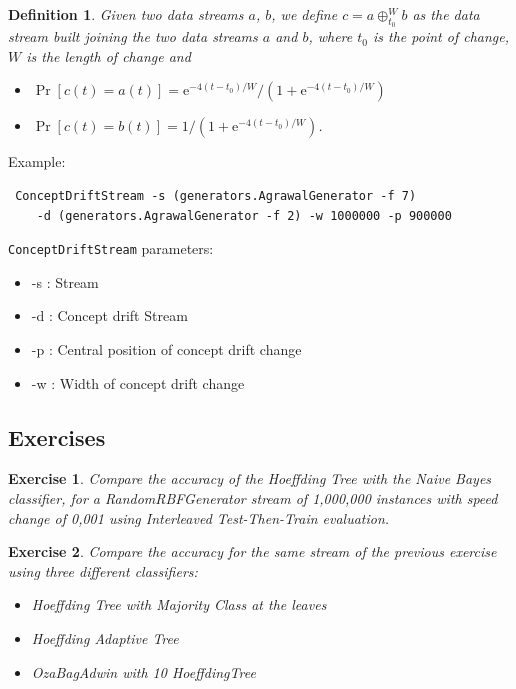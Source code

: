 \documentclass[a4paper,12pt]{article}
\newtheorem{definition}{Definition}{}
\newtheorem{exercise}{Exercise}{}
\begin{document}
\begin{definition} %
Given two data streams $a$, $b$, we define $c = a  \oplus^{W}_{t_0} b$ as the 
data stream built joining the two data streams $a$ and $b$, where
$t_0$ is the point of change, $W$ is the length of change and 
\begin{itemize}
 \item $\Pr[ c(t) = a(t)] = \mathrm e^{-4(t-t_0)/W}/{(1+ \mathrm e^{-4(t-t_0)/W})}$
 \item $\Pr[ c(t) = b(t)] = 1/{(1+ \mathrm e^{-4(t-t_0)/W})}$.
\end{itemize}
\end{definition}


Example:
\begin{footnotesize}\begin{verbatim}
 ConceptDriftStream -s (generators.AgrawalGenerator -f 7) 
    -d (generators.AgrawalGenerator -f 2) -w 1000000 -p 900000 
\end{verbatim}\end{footnotesize}
\texttt{ConceptDriftStream} parameters:

\begin{itemize}
\item -s : Stream 
\item -d : Concept drift Stream
\item -p : Central position of concept drift change
\item -w : Width of concept drift change\end{itemize}


\subsection{Exercises}

\begin{exercise}Compare the accuracy of the Hoeffding Tree with the Naive Bayes classifier, for a RandomRBFGenerator stream of 1,000,000 instances with speed change of 0,001 using Interleaved Test-Then-Train evaluation.  
\end{exercise}
\begin{exercise}Compare the accuracy for the same stream of the previous exercise using three different classifiers:
\begin{itemize}
 \item Hoeffding Tree with Majority Class at the leaves
 \item Hoeffding Adaptive Tree
 \item OzaBagAdwin with 10 HoeffdingTree

\end{itemize}
\end{exercise}
\end{document}

